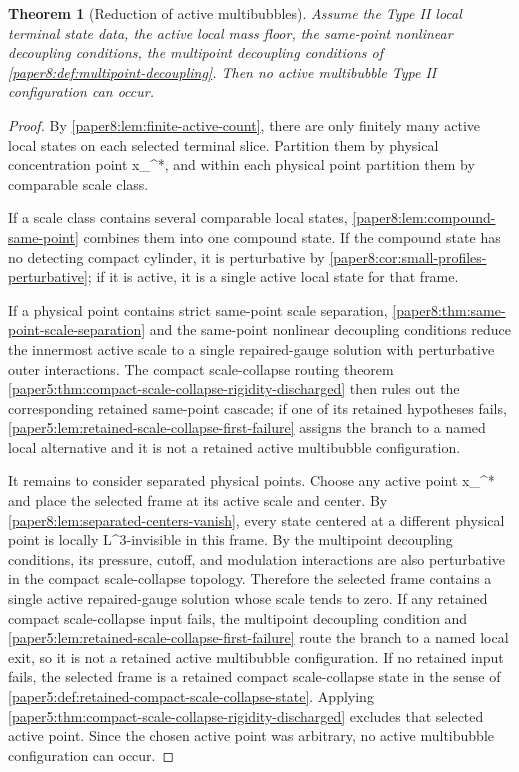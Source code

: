 \documentclass[11pt]{amsart}
\def\({}%
\def\){}%
\theoremstyle{plain}
\newtheorem{theorem}{Theorem}[section]
\theoremstyle{definition}
\theoremstyle{remark}
\begin{document}
\begin{theorem}[Reduction of active multibubbles]
\label{paper8:thm:multibubble-frame-reduction}
Assume the Type II local terminal state data, the active local mass floor, the
same-point nonlinear decoupling conditions, the multipoint decoupling conditions of
\cref{paper8:def:multipoint-decoupling}.  Then no active multibubble Type II
configuration can occur.
\end{theorem}

\begin{proof}
By \cref{paper8:lem:finite-active-count}, there are only finitely many active
local states on each selected terminal slice.  Partition them by physical
concentration point \(x_\alpha^*\), and
within each physical point partition them by comparable scale class.

If a scale class contains several comparable local states,
\cref{paper8:lem:compound-same-point} combines them into one compound state.
If the compound state has no detecting compact cylinder, it is perturbative by
\cref{paper8:cor:small-profiles-perturbative}; if it is active, it is a single
active local state for that frame.

If a physical point contains strict same-point scale separation,
\cref{paper8:thm:same-point-scale-separation} and the same-point nonlinear
decoupling conditions reduce the innermost active scale to a single
repaired-gauge solution with perturbative outer interactions.  The compact
scale-collapse routing theorem
\cref{paper5:thm:compact-scale-collapse-rigidity-discharged} then rules out
the corresponding retained same-point cascade; if one of its retained
hypotheses fails,
\cref{paper5:lem:retained-scale-collapse-first-failure} assigns the branch to a
named local alternative and it is not a retained active multibubble
configuration.

It remains to consider separated physical points.  Choose any active point
\(x_\alpha^*\) and place the selected frame at its active scale and center.
By \cref{paper8:lem:separated-centers-vanish}, every state centered at a
different physical point is locally \(L^3\)-invisible in this frame.  By the
multipoint decoupling conditions, its pressure, cutoff, and modulation
interactions are also perturbative in the compact scale-collapse topology.
Therefore the selected frame contains a single active repaired-gauge solution
whose scale tends to zero.  If any retained compact scale-collapse input fails,
the multipoint decoupling condition and
\cref{paper5:lem:retained-scale-collapse-first-failure} route the branch to a
named local exit, so it is not a retained active multibubble configuration.  If
no retained input fails, the selected frame is a retained compact
scale-collapse state in the sense of
\cref{paper5:def:retained-compact-scale-collapse-state}.  Applying
\cref{paper5:thm:compact-scale-collapse-rigidity-discharged} excludes that
selected active point.  Since the chosen active point was arbitrary, no active
multibubble configuration can occur.
\end{proof}
\end{document}
